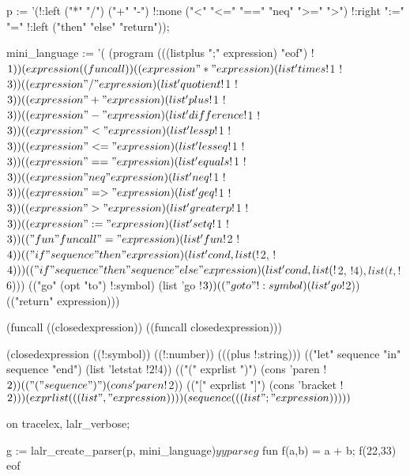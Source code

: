 \documentclass{article}
\begin{document}
p := '(!:left ("*" "/")
              ("+" "-")
       !:none ("<" "<=" "==" "neq" ">=" ">")
       !:right ":=" "="
       !:left ("then" "else" "return"));

mini_language := '(
 (program
          (((listplus ";" expression) "eof") !$1))

 (expression
          ((funcall))
          ((expression "*" expression) (list 'times !$1 !$3))
          ((expression "/" expression) (list 'quotient !$1 !$3))
          ((expression "+" expression) (list 'plus !$1 !$3))
          ((expression "-" expression) (list 'difference !$1 !$3))
          ((expression "<" expression) (list 'lessp !$1 !$3))
          ((expression "<=" expression) (list 'lesseq !$1 !$3))
          ((expression "==" expression) (list 'equals !$1 !$3))
          ((expression "neq" expression) (list 'neq !$1 !$3))
          ((expression "=>" expression) (list 'geq !$1 !$3))
          ((expression ">" expression) (list 'greaterp !$1 !$3))
          ((expression ":=" expression) (list 'setq !$1 !$3))
          (("fun" funcall "=" expression) (list 'fun !$2 !$4))
          (("if" sequence "then" expression)
             (list 'cond, list(!$2, !$4)))
          (("if" sequence "then" sequence "else" expression)
             (list 'cond, list(!$2, !$4), list(t, !$6)))
          (("go" (opt "to") !:symbol) (list 'go !$3))
          (("goto" !:symbol) (list 'go !$2))
          (("return" expression)))

(funcall
          ((closedexpression))
          ((funcall closedexpression)))

(closedexpression
          ((!:symbol))
          ((!:number))
          (((plus !:string))) %
          (("let" sequence "in" sequence "end") (list 'letstat !$2 !$4))
          (("(" exprlist ")") (cons 'paren !$2))
          (("(" sequence ")") (cons 'paren !$2))
          (("[" exprlist "]") (cons 'bracket !$2)))

(exprlist (((list "," expression))))

(sequence
          (((list ";" expression)))))$

on tracelex, lalr_verbose;

g := lalr_create_parser(p, mini_language)$

yyparse g$
fun f(a,b) = a + b;
f(22,33)
eof
\end{document}
